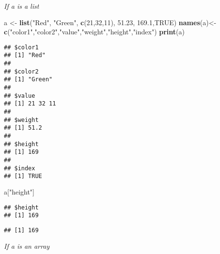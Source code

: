 \documentclass[]{book}
\newenvironment{Shaded}{\begin{snugshade}}{\end{snugshade}}
\newcommand{\KeywordTok}[1]{\textcolor[rgb]{0.13,0.29,0.53}{\textbf{#1}}}
\newcommand{\DecValTok}[1]{\textcolor[rgb]{0.00,0.00,0.81}{#1}}
\newcommand{\FloatTok}[1]{\textcolor[rgb]{0.00,0.00,0.81}{#1}}
\newcommand{\StringTok}[1]{\textcolor[rgb]{0.31,0.60,0.02}{#1}}
\newcommand{\OtherTok}[1]{\textcolor[rgb]{0.56,0.35,0.01}{#1}}
\newcommand{\OperatorTok}[1]{\textcolor[rgb]{0.81,0.36,0.00}{\textbf{#1}}}
\newcommand{\NormalTok}[1]{#1}
\theoremstyle{definition}
\theoremstyle{definition}
\theoremstyle{definition}
\theoremstyle{remark}
\begin{document}
\emph{If a is a list}

\begin{Shaded}
\begin{Highlighting}[]
\NormalTok{a <-}\StringTok{ }\KeywordTok{list}\NormalTok{(}\StringTok{"Red"}\NormalTok{, }\StringTok{"Green"}\NormalTok{, }\KeywordTok{c}\NormalTok{(}\DecValTok{21}\NormalTok{,}\DecValTok{32}\NormalTok{,}\DecValTok{11}\NormalTok{),  }\FloatTok{51.23}\NormalTok{, }\FloatTok{169.1}\NormalTok{,}\OtherTok{TRUE}\NormalTok{)}
\KeywordTok{names}\NormalTok{(a)<-}\KeywordTok{c}\NormalTok{(}\StringTok{"color1"}\NormalTok{,}\StringTok{"color2"}\NormalTok{,}\StringTok{"value"}\NormalTok{,}\StringTok{"weight"}\NormalTok{,}\StringTok{"height"}\NormalTok{,}\StringTok{"index"}\NormalTok{)}
\KeywordTok{print}\NormalTok{(a)}
\end{Highlighting}
\end{Shaded}

\begin{verbatim}
## $color1
## [1] "Red"
## 
## $color2
## [1] "Green"
## 
## $value
## [1] 21 32 11
## 
## $weight
## [1] 51.2
## 
## $height
## [1] 169
## 
## $index
## [1] TRUE
\end{verbatim}

\begin{Shaded}
\begin{Highlighting}[]
\NormalTok{a[}\StringTok{"height"}\NormalTok{]}
\end{Highlighting}
\end{Shaded}

\begin{verbatim}
## $height
## [1] 169
\end{verbatim}

\begin{Shaded}
\end{Shaded}

\begin{verbatim}
## [1] 169
\end{verbatim}

\emph{If a is an array}
\end{document}
